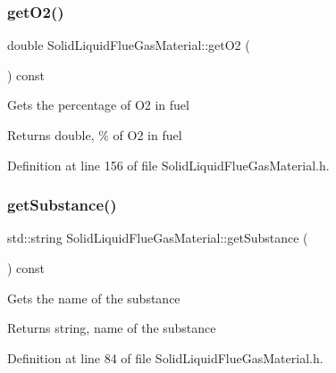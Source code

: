 \subsubsection{\texorpdfstring{get\+O2()}{getO2()}\hspace{0.1cm}{\footnotesize\ttfamily [3/3]}}
{\footnotesize\ttfamily double Solid\+Liquid\+Flue\+Gas\+Material\+::get\+O2 (\begin{DoxyParamCaption}{ }\end{DoxyParamCaption}) const\hspace{0.3cm}{\ttfamily [inline]}}

Gets the percentage of O2 in fuel \begin{DoxyReturn}{Returns}
double, \% of O2 in fuel 
\end{DoxyReturn}


Definition at line 156 of file Solid\+Liquid\+Flue\+Gas\+Material.\+h.

\mbox{\label{class_solid_liquid_flue_gas_material_a6e07a23fb05c15c7e5dba39334988de8}} 
\subsubsection{\texorpdfstring{get\+Substance()}{getSubstance()}\hspace{0.1cm}{\footnotesize\ttfamily [1/3]}}
{\footnotesize\ttfamily std\+::string Solid\+Liquid\+Flue\+Gas\+Material\+::get\+Substance (\begin{DoxyParamCaption}{ }\end{DoxyParamCaption}) const\hspace{0.3cm}{\ttfamily [inline]}}

Gets the name of the substance \begin{DoxyReturn}{Returns}
string, name of the substance 
\end{DoxyReturn}


Definition at line 84 of file Solid\+Liquid\+Flue\+Gas\+Material.\+h.

\mbox{\label{class_solid_liquid_flue_gas_material_a6e07a23fb05c15c7e5dba39334988de8}} 
